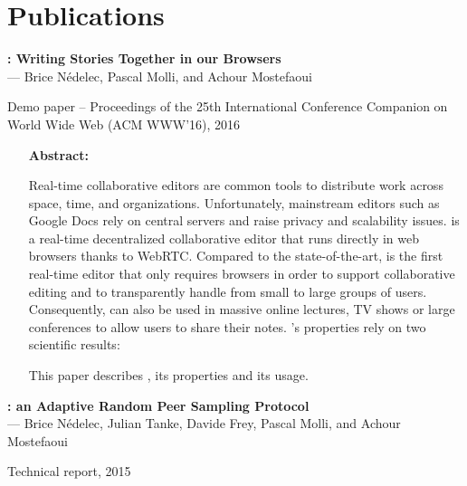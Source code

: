 
\section{Publications}


\noindent \textbf{\CRATE: Writing Stories Together in our Browsers}\\
\indent --- Brice Nédelec, Pascal Molli, and Achour Mostefaoui

\noindent Demo paper -- Proceedings of the 25th International Conference
Companion on World Wide Web (ACM WWW'16), 2016

\begin{itemize}
\item [\textbf{Abstract:}] {\small Real-time collaborative editors are common
    tools to distribute work across space, time, and
    organizations. Unfortunately, mainstream editors such as Google Docs rely on
    central servers and raise privacy and scalability issues.  \CRATE is a
    real-time decentralized collaborative editor that runs directly in web
    browsers thanks to WebRTC. Compared to the state-of-the-art, \CRATE is the
    first real-time editor that only requires browsers in order to support
    collaborative editing and to transparently handle from small to large groups
    of users. Consequently, \CRATE can also be used in massive online lectures,
    TV shows or large conferences to allow users to share their notes. \CRATE's
    properties rely on two scientific results:
  This paper describes \CRATE, its properties and its usage.}
\end{itemize}


\noindent \textbf{\SPRAY: an Adaptive Random Peer Sampling Protocol}\\
\indent --- Brice Nédelec, Julian Tanke, Davide Frey, Pascal Molli, and Achour
Mostefaoui

\noindent Technical report, 2015

